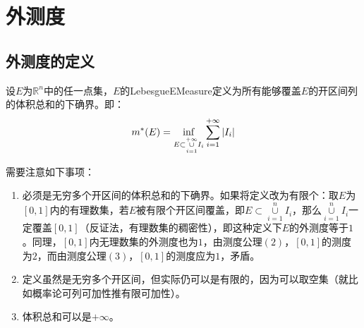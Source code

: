 \section{外测度}
\subsection{外测度的定义}
\begin{definition}
	设$E$为$\mathbb{R}^n$中的任一点集，$E$的Lebesgue\gls{EMeasure}定义为所有能够覆盖$E$的开区间列的体积总和的下确界。即：
	\begin{equation}
		m^*(E)=\inf_{E\subset\underset{i=1}{\overset{+\infty}{\cup}}I_i}\sum_{i=1}^{+\infty}|I_i|\notag
	\end{equation}
\end{definition}
需要注意如下事项：
\begin{enumerate}
	\item 必须是无穷多个开区间的体积总和的下确界。如果将定义改为有限个：取$E$为$[0,1]$内的有理数集，若$E$被有限个开区间覆盖，即$E\subset\underset{i=1}{\overset{n}{\cup}}I_i$，那么$\underset{i=1}{\overset{n}{\cup}}I_i$一定覆盖$[0,1]$（反证法，有理数集的稠密性），即这种定义下$E$的外测度等于$1$。同理，$[0,1]$内无理数集的外测度也为$1$，由测度公理$(2)$，$[0,1]$的测度为$2$，而由测度公理$(3)$，$[0,1]$的测度应为$1$，矛盾。
	\item 定义虽然是无穷多个开区间，但实际仍可以是有限的，因为可以取空集（就比如概率论可列可加性推有限可加性）。 
	\item 体积总和可以是$+\infty$。
\end{enumerate}
